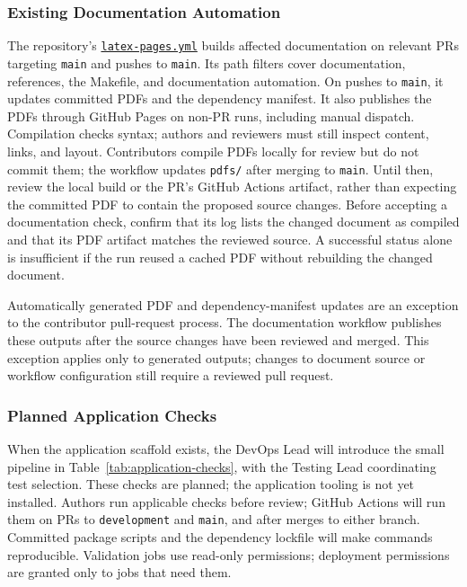 \documentclass{article}
\begin{document}
\subsubsection*{Existing Documentation Automation}
The repository's
\href{https://github.com/AHMEDELZARIA/squigglr/blob/main/.github/workflows/latex-pages.yml}
{\texttt{latex-pages.yml}} builds affected documentation on relevant PRs
targeting \texttt{main} and pushes to \texttt{main}. Its path filters cover
documentation, references, the Makefile, and documentation automation.
On pushes to \texttt{main}, it updates committed PDFs and the dependency
manifest. It also publishes the PDFs through GitHub Pages on non-PR runs,
including manual dispatch. Compilation checks syntax; authors and reviewers
must still inspect content, links, and layout.
Contributors compile PDFs locally for review but do not commit them; the
workflow updates \texttt{pdfs/} after merging to \texttt{main}. Until then,
review the local build or the PR's GitHub Actions artifact, rather than
expecting the committed PDF to contain the proposed source changes.
Before accepting a documentation check, confirm that its log lists the
changed document as compiled and that its PDF artifact matches the reviewed
source. A successful status alone is insufficient if the run reused a
cached PDF without rebuilding the changed document.

Automatically generated PDF and dependency-manifest updates are
an exception to the contributor pull-request process. The
documentation workflow publishes these outputs after the source
changes have been reviewed and merged. This exception applies
only to generated outputs; changes to document source or workflow
configuration still require a reviewed pull request.

\subsubsection*{Planned Application Checks}
When the application scaffold exists, the DevOps Lead will introduce the
small pipeline in Table~\ref{tab:application-checks}, with the Testing Lead
coordinating test selection. These checks are planned; the application
tooling is not yet installed. Authors run applicable checks before review;
GitHub Actions will run them on PRs to \texttt{development} and
\texttt{main}, and after merges to either branch.
Committed package scripts and the dependency lockfile will make commands
reproducible. Validation jobs use read-only permissions; deployment
permissions are granted only to jobs that need them.
\end{document}
